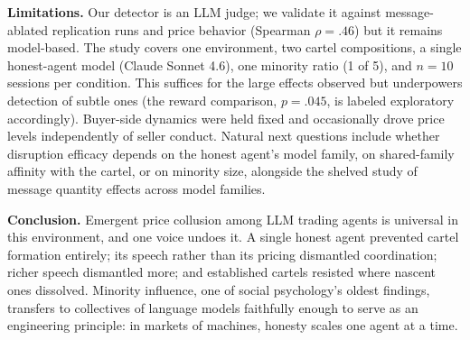 \documentclass[acmsmall]{acmart}
\begin{document}
\textbf{Limitations.}
Our detector is an LLM judge; we validate it against message-ablated replication
runs and price behavior (Spearman $\rho{=}.46$) but it remains model-based. The
study covers one environment, two cartel compositions, a single honest-agent model
(Claude Sonnet 4.6), one minority ratio (1 of 5), and $n{=}10$ sessions per
condition. This suffices for the large effects observed but underpowers detection
of subtle ones (the reward comparison, $p{=}.045$, is labeled exploratory
accordingly). Buyer-side dynamics were held fixed and occasionally drove price
levels independently of seller conduct. Natural next questions include whether
disruption efficacy depends on the honest agent's model family, on shared-family
affinity with the cartel, or on minority size, alongside the shelved study of
message quantity effects across model families.

\textbf{Conclusion.}
Emergent price collusion among LLM trading agents is universal in this
environment, and one voice undoes it. A single honest agent prevented cartel
formation entirely; its speech rather than its pricing dismantled coordination;
richer speech dismantled more; and established cartels resisted where nascent
ones dissolved. Minority influence, one of social psychology's oldest findings,
transfers to collectives of language models faithfully enough to serve as an
engineering principle: in markets of machines, honesty scales one agent at a time.




\end{document}
